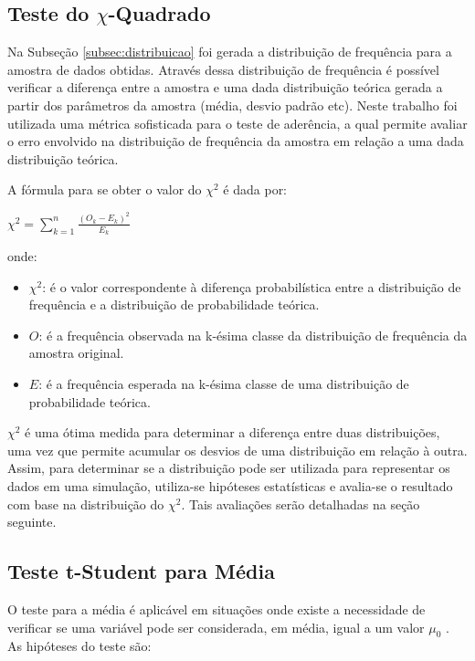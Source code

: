 \documentclass[pt,disc,oneside]{ufscpgeasthesis}
\begin{document}
			\subsection{Teste do {\Large $\chi$}-Quadrado}
			\label{subsec:teste}

				Na Subseção \ref{subsec:distribuicao} foi gerada a distribuição de frequência para a amostra de dados obtidas.
				Através dessa distribuição de frequência é possível verificar a diferença entre a amostra e uma dada distribuição teórica gerada a partir dos parâmetros da amostra (média, desvio padrão etc).
				Neste trabalho foi utilizada uma métrica sofisticada para o teste de aderência, a qual permite avaliar o erro envolvido na distribuição de frequência da amostra em relação a uma dada distribuição teórica.

				A fórmula para se obter o valor do $\chi^2$ é dada por:

				\begin{center}
					\LARGE{$\chi^2= \sum_{k=1}^{n} \frac{(O_k - E_k)^2}{E_k}$}
				\end{center}

				onde:

				\begin{itemize}
					\item{$\chi^2$:} é o valor correspondente à diferença probabilística entre a distribuição de frequência e a distribuição de probabilidade teórica.
					\item{$O$:} é a frequência observada na k-ésima classe da distribuição de frequência da amostra original.
					\item{$E$:} é a frequência esperada na k-ésima classe de uma distribuição de probabilidade teórica.
				\end{itemize}

				$\chi^2$ é uma ótima medida para determinar a diferença entre duas distribuições, uma vez que permite acumular os desvios de uma distribuição em relação à outra.
				Assim, para determinar se a distribuição pode ser utilizada para representar os dados em uma simulação, utiliza-se hipóteses estatísticas e avalia-se o resultado com base na distribuição do $\chi^2$.
				Tais avaliações serão detalhadas na seção seguinte.

			\subsection{Teste t-Student para Média}
			\label{subsec:testeStudent}

				O teste para a média é aplicável em situações onde existe a necessidade de verificar se uma variável pode ser considerada, em média, igual a um valor $\mu_0$ \cite{Sturges}.
				As hipóteses do teste são:
\end{document}
